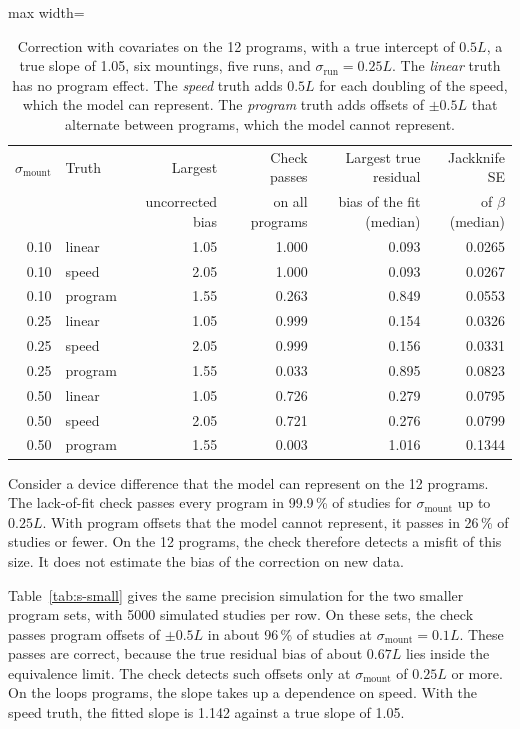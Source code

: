 \documentclass[11pt,a4paper]{article}
\begin{document}
\begin{table}[ht]
\centering
\caption{Correction with covariates on the 12 programs, with a true intercept of $0.5L$, a true slope of 1.05, six mountings, five runs, and $\sigma_\mathrm{run}=0.25L$.
The \emph{linear} truth has no program effect.
The \emph{speed} truth adds $0.5L$ for each doubling of the speed, which the model can represent.
The \emph{program} truth adds offsets of $\pm0.5L$ that alternate between programs, which the model cannot represent.}
\label{tab:s-correction}
\begin{adjustbox}{max width=\linewidth}\begin{tabular}{@{}rlrrrr@{}}
\toprule
$\sigma_\mathrm{mount}$ & Truth & Largest & Check passes & Largest true residual & Jackknife SE \\
 & & uncorrected bias & on all programs & bias of the fit (median) & of $\beta$ (median) \\
\midrule
0.10 & linear & 1.05 & 1.000 & 0.093 & 0.0265 \\
0.10 & speed & 2.05 & 1.000 & 0.093 & 0.0267 \\
0.10 & program & 1.55 & 0.263 & 0.849 & 0.0553 \\
0.25 & linear & 1.05 & 0.999 & 0.154 & 0.0326 \\
0.25 & speed & 2.05 & 0.999 & 0.156 & 0.0331 \\
0.25 & program & 1.55 & 0.033 & 0.895 & 0.0823 \\
0.50 & linear & 1.05 & 0.726 & 0.279 & 0.0795 \\
0.50 & speed & 2.05 & 0.721 & 0.276 & 0.0799 \\
0.50 & program & 1.55 & 0.003 & 1.016 & 0.1344 \\
\bottomrule
\end{tabular}\end{adjustbox}
\end{table}

Consider a device difference that the model can represent on the 12 programs.
The lack-of-fit check passes every program in 99.9\,\% of studies for $\sigma_\mathrm{mount}$ up to $0.25L$.
With program offsets that the model cannot represent, it passes in 26\,\% of studies or fewer.
On the 12 programs, the check therefore detects a misfit of this size.
It does not estimate the bias of the correction on new data.

Table~\ref{tab:s-small} gives the same precision simulation for the two smaller program sets, with 5000 simulated studies per row.
On these sets, the check passes program offsets of $\pm0.5L$ in about 96\,\% of studies at $\sigma_\mathrm{mount}=0.1L$.
These passes are correct, because the true residual bias of about $0.67L$ lies inside the equivalence limit.
The check detects such offsets only at $\sigma_\mathrm{mount}$ of $0.25L$ or more.
On the loops programs, the slope takes up a dependence on speed.
With the speed truth, the fitted slope is 1.142 against a true slope of 1.05.
\end{document}
